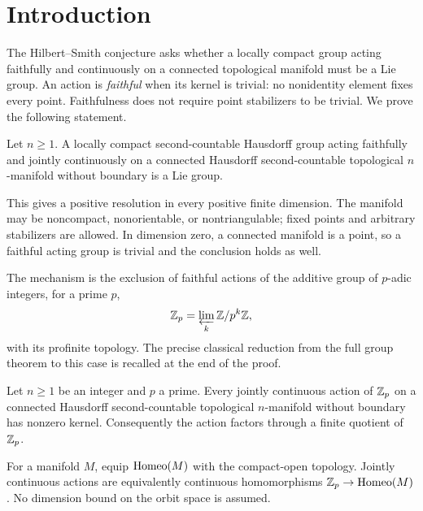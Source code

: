 \section{Introduction}\label{sec:introduction}

The Hilbert--Smith conjecture asks whether a locally compact group acting
faithfully and continuously on a connected topological manifold must be
a Lie group. An action is \emph{faithful} when its kernel is trivial:
no nonidentity element fixes every point. Faithfulness does not require
point stabilizers to be trivial. We prove the following statement.

\begin{theorem}\label{cor:lie}
Let \(n\geq1\). A locally compact second-countable Hausdorff group
acting faithfully and jointly continuously on a connected Hausdorff
second-countable topological \(n\)-manifold without boundary is a Lie
group.
\end{theorem}

This gives a positive resolution in every positive finite dimension.
The manifold may be noncompact, nonorientable, or nontriangulable;
fixed points and arbitrary stabilizers are allowed. In dimension zero,
a connected manifold is a point, so a faithful acting group is trivial
and the conclusion holds as well.

The mechanism is the exclusion of faithful actions of the additive
group of \(p\)-adic integers, for a prime \(p\),
\[
  \mathbb Z_p=\varprojlim_k\mathbb Z/p^k\mathbb Z,
\]
with its profinite topology. The precise classical reduction from the
full group theorem to this case is recalled at the end of the proof.

\begin{theorem}\label{thm:main}
Let \(n\geq1\) be an integer and \(p\) a prime. Every jointly continuous
action of \(\mathbb Z_p\) on a connected Hausdorff second-countable topological
\(n\)-manifold without boundary has nonzero kernel. Consequently the
action factors through a finite quotient of \(\mathbb Z_p\).
\end{theorem}

For a manifold \(M\), equip \(\operatorname{Homeo}(M)\) with the compact-open
topology. Jointly continuous
actions are equivalently continuous homomorphisms
\(\mathbb Z_p\to\operatorname{Homeo}(M)\). No dimension bound on the orbit space is assumed.

